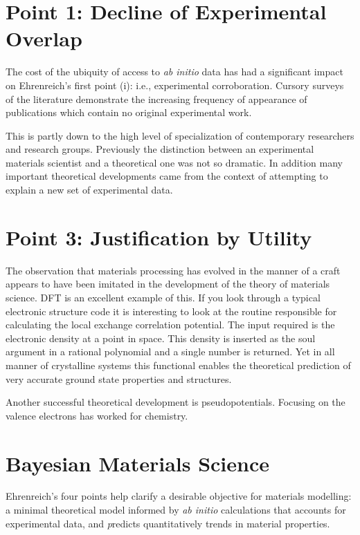 \section{Point 1: Decline of Experimental Overlap}
The cost of the ubiquity of access to {\it ab initio} data has had a significant impact on 
Ehrenreich's first point (i): i.e., experimental corroboration. Cursory surveys of the literature 
demonstrate the increasing frequency of appearance of publications which contain no 
original experimental work. 

This is partly down to the high level of specialization of contemporary 
researchers and research groups. Previously the distinction between
an experimental materials scientist and a theoretical one was not so dramatic. 
In addition many important theoretical developments came 
from the context of attempting to explain a new set of experimental data.


\section{Point 3: Justification by Utility}
The observation that materials processing has evolved in the manner of a craft appears to have
been imitated in the development of the theory of materials science. DFT is an excellent example of this.
If you look through a typical electronic structure code it is interesting to look at the routine
responsible for calculating the local exchange correlation potential. The input required is the 
electronic density at a point in space. This density is inserted as the soul argument in a rational polynomial
and a single number is returned. Yet in all manner of crystalline systems this functional enables the theoretical
prediction of very accurate ground state properties and structures. 

Another successful theoretical development is pseudopotentials. Focusing on the valence electrons 
has worked for chemistry.

\section{Bayesian Materials Science}
Ehrenreich's four points help clarify a desirable objective for materials modelling:
a minimal theoretical model informed by {\it ab initio} calculations that accounts for 
experimental data, and {\emph predicts} quantitatively trends in material properties. 

